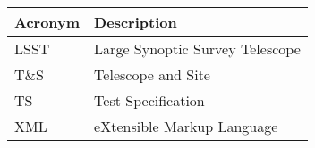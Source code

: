 \addtocounter{table}{-1}
\begin{longtable}{|l|p{}|}\hline
\textbf{Acronym} & \textbf{Description}  \\\hline

LSST & Large Synoptic Survey Telescope \\\hline
T\&S & Telescope and Site \\\hline
TS & Test Specification \\\hline
XML & eXtensible Markup Language \\\hline
\end{longtable}
